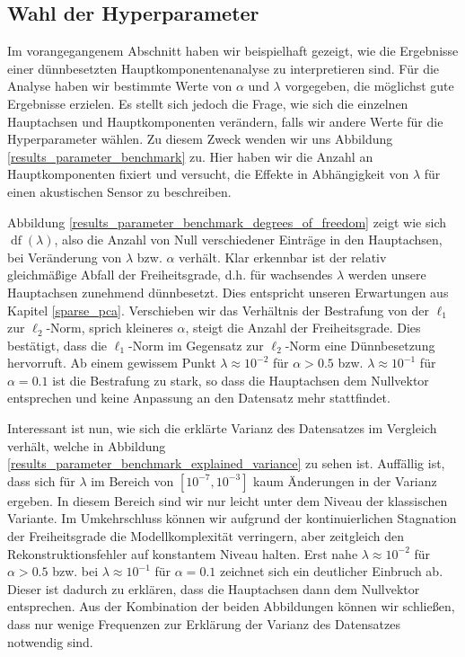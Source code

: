 

\subsection{Wahl der Hyperparameter}

Im vorangegangenem Abschnitt haben wir beispielhaft gezeigt, wie die Ergebnisse einer dünnbesetzten Hauptkomponentenanalyse zu interpretieren sind. Für die Analyse haben wir bestimmte Werte von $\alpha$ und $\lambda$ vorgegeben, die möglichst gute Ergebnisse erzielen. Es stellt sich jedoch die Frage, wie sich die einzelnen Hauptachsen und Hauptkomponenten verändern, falls wir andere Werte für die Hyperparameter wählen. Zu diesem Zweck wenden wir uns Abbildung \ref{results_parameter_benchmark} zu. Hier haben wir die Anzahl an Hauptkomponenten fixiert und versucht, die Effekte in Abhängigkeit von $\lambda$ für einen akustischen Sensor zu beschreiben.

Abbildung \ref{results_parameter_benchmark_degrees_of_freedom} zeigt wie sich $\operatorname{df}(\lambda)$, also die Anzahl von Null verschiedener Einträge in den Hauptachsen, bei Veränderung von $\lambda$ bzw. $\alpha$ verhält. Klar erkennbar ist der relativ gleichmäßige Abfall der Freiheitsgrade, d.h. für wachsendes $\lambda$ werden unsere Hauptachsen zunehmend dünnbesetzt. Dies entspricht unseren Erwartungen aus Kapitel \ref{sparse_pca}. Verschieben wir das Verhältnis der Bestrafung von der $\ell_1$ zur $\ell_2$-Norm, sprich kleineres $\alpha$, steigt die Anzahl der Freiheitsgrade. Dies bestätigt, dass die $\ell_1$-Norm im Gegensatz zur $\ell_2$-Norm eine Dünnbesetzung hervorruft. Ab einem gewissem Punkt $\lambda \approx 10^{-2}$ für $\alpha > 0.5$ bzw. $\lambda \approx 10^{-1}$ für $\alpha = 0.1$ ist die Bestrafung zu stark, so dass die Hauptachsen dem Nullvektor entsprechen und keine Anpassung an den Datensatz mehr stattfindet.

Interessant ist nun, wie sich die erklärte Varianz des Datensatzes im Vergleich verhält, welche in Abbildung \ref{results_parameter_benchmark_explained_variance} zu sehen ist.  Auffällig ist, dass sich für $\lambda$ im Bereich von $[10^{-7}, 10^{-3}]$ kaum Änderungen in der Varianz ergeben. In diesem Bereich sind wir nur leicht unter dem Niveau der klassischen Variante. Im Umkehrschluss können wir aufgrund der kontinuierlichen Stagnation der Freiheitsgrade die Modellkomplexität verringern, aber zeitgleich den Rekonstruktionsfehler auf konstantem Niveau halten. Erst nahe $\lambda \approx 10^{-2}$ für $\alpha > 0.5$ bzw. bei $\lambda \approx 10^{-1}$ für $\alpha = 0.1$ zeichnet sich ein deutlicher Einbruch ab. Dieser ist dadurch zu erklären, dass die Hauptachsen dann dem Nullvektor entsprechen. Aus der Kombination der beiden Abbildungen können wir schließen, dass nur wenige Frequenzen zur Erklärung der Varianz des Datensatzes notwendig sind.

